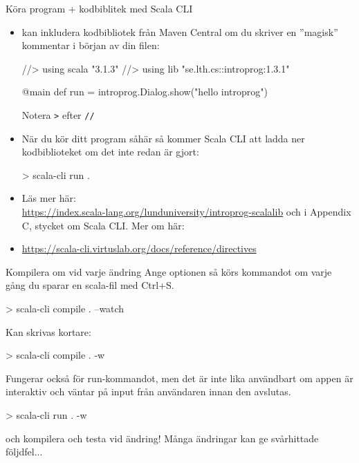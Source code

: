 \begin{Slide}{Köra program + kodbiblitek med Scala CLI}\SlideFontTiny
\begin{itemize}
\item {} kan inkludera kodbibliotek från Maven Central om du skriver en ''magisk'' kommentar i början av din filen:
\begin{Code}
//> using scala "3.1.3"
//> using lib "se.lth.cs::introprog:1.3.1"

@main def run = introprog.Dialog.show("hello introprog")
\end{Code}
Notera \texttt{>} efter \texttt{//}

\item När du kör ditt program såhär så kommer Scala CLI att ladda ner kodbiblioteket om det inte redan är gjort:
\begin{REPLsmall}
> scala-cli run .
\end{REPLsmall}
\item Läs mer här:\\\url{https://index.scala-lang.org/lunduniversity/introprog-scalalib} och i Appendix C, stycket om Scala CLI. Mer om  här:
\item[] \url{https://scala-cli.virtuslab.org/docs/reference/directives}
\end{itemize}

\end{Slide}

\begin{Slide}{Kompilera om vid varje ändring}\SlideFontSmall
Ange optionen  så körs kommandot om varje gång du sparar en scala-fil med Ctrl+S.
\begin{REPLsmall}
> scala-cli compile . --watch
\end{REPLsmall}
Kan skrivas kortare:
\begin{REPLsmall}
> scala-cli compile . -w
\end{REPLsmall}
Fungerar också för run-kommandot, men det är inte lika användbart om appen är interaktiv och väntar på input från användaren innan den avslutas. 
\begin{REPLsmall}
> scala-cli run . -w
\end{REPLsmall}
 och kompilera och testa vid  ändring! Många ändringar kan ge svårhittade följdfel...
    
  
\end{Slide}

